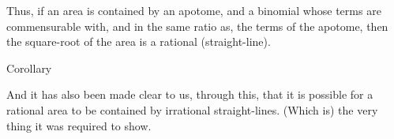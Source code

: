 \begin{Parallel}{}{}
{\epsfysize=1.8in
\centerline{}

Thus, if an area is contained by an apotome, and
a binomial whose terms are commensurable with, and in the same ratio as, the 
terms of the apotome, then the square-root of the area is a rational (straight-line).\\

\begin{center}
{\large Corollary}
\end{center}\vspace*{-7pt}

And it has also been made clear to us,  through this,  that it is
possible for  a rational
area to be contained by irrational straight-lines. (Which is) the very thing it was required to show.}
\end{Parallel}

